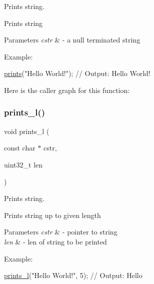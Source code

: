 Prints string. 

Prints string 
\begin{DoxyParams}{Parameters}
{\em cstr} & -\/ a null terminated string\\
\hline
\end{DoxyParams}
Example\+: 
\begin{DoxyCode}
\mbox{\hyperlink{group__consolecapi_gaa99be0cc1b9e5cbbc2b12a43537e7ed3}{prints}}(\textcolor{stringliteral}{"Hello World!"}); \textcolor{comment}{// Output: Hello World!}
\end{DoxyCode}
 Here is the caller graph for this function\+:
\mbox{\label{group__consolecapi_ga63ff8a7c0b046968ab2864df7284c910}} 
\subsubsection{\texorpdfstring{prints\+\_\+l()}{prints\_l()}}
{\footnotesize\ttfamily void prints\+\_\+l (\begin{DoxyParamCaption}\item[{const char $\ast$}]{cstr,  }\item[{uint32\+\_\+t}]{len }\end{DoxyParamCaption})}



Prints string. 

Prints string up to given length 
\begin{DoxyParams}{Parameters}
{\em cstr} & -\/ pointer to string \\
\hline
{\em len} & -\/ len of string to be printed\\
\hline
\end{DoxyParams}
Example\+: 
\begin{DoxyCode}
\mbox{\hyperlink{group__consolecapi_ga63ff8a7c0b046968ab2864df7284c910}{prints\_l}}(\textcolor{stringliteral}{"Hello World!"}, 5); \textcolor{comment}{// Output: Hello}
\end{DoxyCode}
 